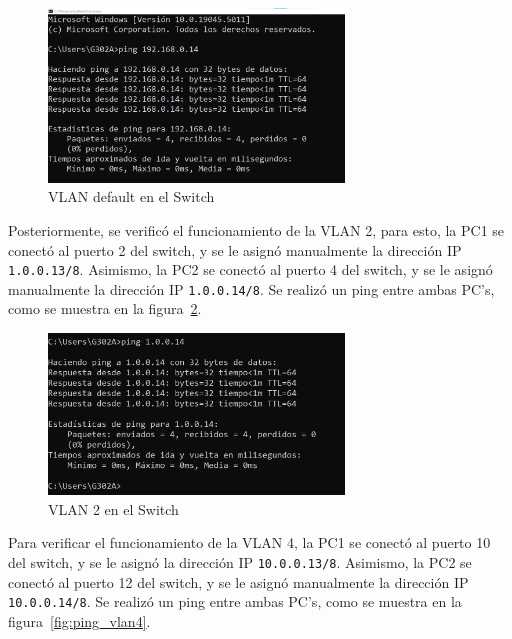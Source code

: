         \begin{figure}[H]
            \centering
            \includegraphics[width=0.7\textwidth]{img/ping_default.png}
            \caption{VLAN default en el Switch}
            \label{fig:ping_default}
        \end{figure}

        Posteriormente, se verificó el funcionamiento de la VLAN 2, para esto, la PC1 se conectó al puerto 2 del switch, y se le asignó manualmente la dirección IP \texttt{1.0.0.13/8}. Asimismo, la PC2 se conectó al puerto 4 del switch, y se le asignó manualmente la dirección IP \texttt{1.0.0.14/8}. Se realizó un ping entre ambas PC's, como se muestra en la figura~\ref{fig:ping_vlan2}.

        \begin{figure}[H]
            \centering
            \includegraphics[width=0.7\textwidth]{img/ping_vlan2.png}
            \caption{VLAN 2 en el Switch}
            \label{fig:ping_vlan2}
        \end{figure}

        Para verificar el funcionamiento de la VLAN 4, la PC1 se conectó al puerto 10 del switch, y se le asignó la dirección IP \texttt{10.0.0.13/8}. Asimismo, la PC2 se conectó al puerto 12 del switch, y se le asignó manualmente la dirección IP \texttt{10.0.0.14/8}. Se realizó un ping entre ambas PC's, como se muestra en la figura~\ref{fig:ping_vlan4}.

